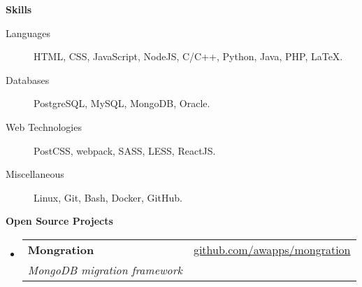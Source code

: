 \documentclass[letterpaper,11pt]{article}
\makeatletter
\newcommand{\resheading}[1]{{\large \colorbox{mygrey}{\begin{minipage}{\textwidth}{\textbf{#1 \vphantom{p\^{E}}}}\end{minipage}}}}
\newcommand{\ressubheading}[4]{
\begin{tabular*}{7.0in}{l@{\extracolsep{\fill}}r}
    \textbf{#1} & #2 \\
    \textit{#3} & \textit{#4} \\
\end{tabular*}\vspace{-6pt}}
\makeatother
\begin{document}
    \resheading{Skills}
    \begin{description}
        \item[Languages]
            HTML, CSS, JavaScript, NodeJS, C/C++, Python, Java, PHP, \LaTeX.
        \item[Databases]
            PostgreSQL, MySQL, MongoDB, Oracle.
        \item[Web Technologies]
            PostCSS, webpack, SASS, LESS, ReactJS.
        \item[Miscellaneous]
            Linux, Git, Bash, Docker, GitHub.
    \end{description}

    \resheading{Open Source Projects}
    \begin{itemize}
        \item
            \ressubheading
                {Mongration}
                {\href{https://github.com/awapps/mongration}{github.com/awapps/mongration}}
                {MongoDB migration framework}
                {}
    \end{itemize}
\end{document}
